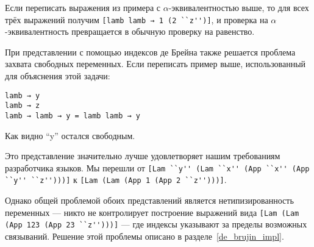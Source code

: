 Если переписать выражения из примера с $\alpha$-эквивалентностью выше, то для всех трёх выражений получим \lstinline{[lamb lamb → 1 (2 ``z'')]}, и проверка на $\alpha$-эквивалентность превращается в обычную проверку на равенство.

При представлении с помощью индексов де Брейна также решается проблема захвата свободных переменных. Если переписать пример выше, использованный для объяснения этой задачи:
\begin{lstlisting}
lamb → y
lamb → z
lamb → lamb → y = lamb lamb → y
\end{lstlisting}

Как видно ``y'' остался свободным.

Это представление значительно лучше удовлетворяет нашим требованиям разработчика языков. Мы перешли от
\lstinline{[Lam ``y'' (Lam ``x'' (App ``x'' (App ``y'' ``z'')))]} к \lstinline{[Lam (Lam (App 1 (App 2 ``z'')))]}.

Однако общей проблемой обоих представлений является нетипизированность переменных --- никто не контролирует построение выражений вида \lstinline{[Lam (Lam (App 123 (App 23 ``z'')))]} --- где индексы указывают за пределы возможных связываний. Решение этой проблемы описано в разделе~\ref{de_brujin_impl}.
